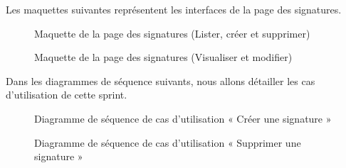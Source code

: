 Les maquettes suivantes représentent les interfaces de la page des signatures.

\begin{figure}[H]
  \centering
  \caption{Maquette de la page des signatures (Lister, créer et supprimer)}
  \label{fig:design_signatures}
\end{figure}

\begin{figure}[H]
  \centering
  \caption{Maquette de la page des signatures (Visualiser et modifier)}
  \label{fig:design_preview_delete_signature}
\end{figure}

Dans les diagrammes de séquence suivants, nous allons détailler les cas d'utilisation de cette sprint.

\begin{figure}[H]
  \centering
  \caption{Diagramme de séquence de cas d'utilisation « Créer une signature  »}
  \label{fig:sequence_create_signature}
\end{figure}

\begin{figure}[H]
  \centering
  \caption{Diagramme de séquence de cas d'utilisation « Supprimer une signature  »}
  \label{fig:sequence_delete_signature}
\end{figure}

